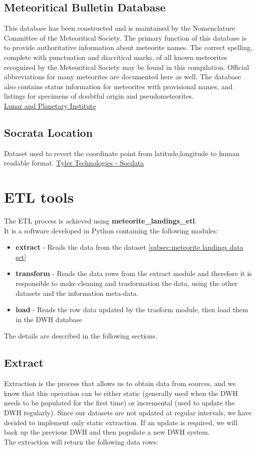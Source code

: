 \documentclass[conference]{IEEEtran}
\begin{document}
	\subsection{Meteoritical Bulletin Database}
	This database has been constructed and is maintained by the Nomenclature Committee of the Meteoritical Society. The primary function of this database is to provide authoritative information about meteorite names. The correct spelling, complete with punctuation and diacritical marks, of all known meteorites recognized by the Meteoritical Society may be found in this compilation. Official abbreviations for many meteorites are documented here as well. The database also contains status information for meteorites with provisional names, and listings for specimens of doubtful origin and pseudometeorites. \\
	\href{https://www.lpi.usra.edu/meteor/}{Lunar and Planetary Institute}
	
	\subsection{Socrata Location}
	Dataset used to revert the coordinate point from latitude,longitude to human readable format.
	\href{https://dev.socrata.com/docs/datatypes/location.html#}{Tyler Technologies - Socdata}
				
	\section{ETL tools}
	The ETL process is achieved using \textbf{meteorite\_landings\_etl}.\\ It is a software developed in Python containing the following modules:
	\begin{itemize}
		\item \textbf{extract} - Reads the data from the dataset \ref{subsec:meteorite landings data set}
		\item \textbf{transform} - Reads the data rows from the extract module and therefore it is responsible to make cleaning and trasformation the data, using the other datasets and the information meta-data.
		\item \textbf{load} - Reads the row data updated by the trasform module, then load them in the DWH database 
	\end{itemize}
	The details are described in the following sections.
	\subsection{Extract}
    Extraction is the process that allows us to obtain data from sources, and we know that this operation can be either static (generally used when the DWH needs to be populated for the first time) or incremental (used to update the DWH regularly). Since our datasets are not updated at regular intervals, we have decided to implement only static extraction. If an update is required, we will back up the previous DWH and then populate a new DWH system.\\ The extraction will return the following data rows:
    
\end{document}
